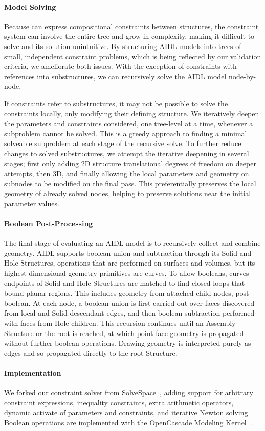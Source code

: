 \paragraph{Model Solving}
Because \langname{} can express compositional constraints between structures, the constraint system can involve the entire tree and grow in complexity, making it difficult to solve and its solution unintuitive. By structuring AIDL models into trees of small, independent constraint problems, which is being reflected by our validation criteria, we ameliorate both issues. With the exception of constraints with references into substructures, we can recursively solve the AIDL model node-by-node.


If constraints refer to substructures, it may not be possible to solve the constraints locally, only modifying their defining structure. 
We iteratively deepen the parameters and constraints considered, one tree-level at a time, whenever a subproblem cannot be solved. This is a greedy approach to finding a minimal solveable subproblem at each stage of the recursive solve. To further reduce changes to solved substructures, we attempt the iterative deepening in several stages; first only adding 2D structure translational degrees of freedom on deeper attempts, then 3D, and finally allowing the local parameters and geometry on subnodes to be modified on the final pass. This preferentially preserves the local geometry of already solved nodes, helping to preserve solutions near the initial parameter values.

\paragraph{Boolean Post-Processing}
The final stage of evaluating an AIDL model is to recursively collect and combine geometry. AIDL supports boolean union and subtraction through its Solid and Hole Structures, operations that are performed on surfaces and volumes, but its highest dimensional geometry primitives are curves. To allow booleans, curves endpoints of Solid and Hole Structures are matched to find closed loops that bound planar regions. This includes geometry from attached child nodes, post boolean. At each node, a boolean union is first carried out over faces discovered from local and Solid descendant edges, and then boolean subtraction performed with faces from Hole children. This recursion continues until an Assembly Structure or the root is reached, at which point face geometry is propagated without further boolean operations. Drawing geometry is interpreted purely as edges and so propagated directly to the root Structure.

\paragraph{Implementation}
We forked our constraint solver from SolveSpace~\cite{westhues_solvespace_2022}, adding support for arbitrary constraint expressions, inequality constraints, extra arithmetic operators, dynamic activate of parameters and constraints, and iterative Newton solving. Boolean operations are implemented with the OpenCascade Modeling Kernel~\cite{occt3d_opencascade_2021}.

\fi